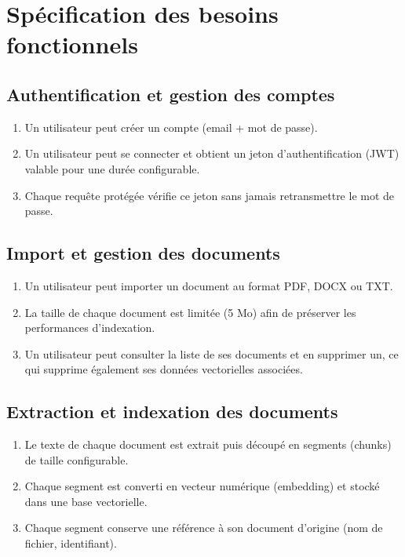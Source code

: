 \documentclass[12pt,a4paper]{report}
\begin{document}
\section{Spécification des besoins fonctionnels}

\subsection{Authentification et gestion des comptes}
\begin{enumerate}
  \item Un utilisateur peut créer un compte (email + mot de passe).
  \item Un utilisateur peut se connecter et obtient un jeton d'authentification (JWT) valable pour une durée configurable.
  \item Chaque requête protégée vérifie ce jeton sans jamais retransmettre le mot de passe.
\end{enumerate}

\subsection{Import et gestion des documents}
\begin{enumerate}
  \item Un utilisateur peut importer un document au format PDF, DOCX ou TXT.
  \item La taille de chaque document est limitée (5 Mo) afin de préserver les performances d'indexation.
  \item Un utilisateur peut consulter la liste de ses documents et en supprimer un, ce qui supprime également ses données vectorielles associées.
\end{enumerate}

\subsection{Extraction et indexation des documents}
\begin{enumerate}
  \item Le texte de chaque document est extrait puis découpé en segments (chunks) de taille configurable.
  \item Chaque segment est converti en vecteur numérique (embedding) et stocké dans une base vectorielle.
  \item Chaque segment conserve une référence à son document d'origine (nom de fichier, identifiant).
\end{enumerate}
\end{document}
